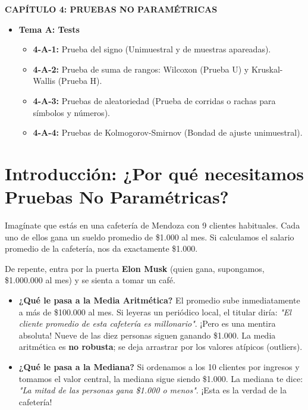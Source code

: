 \documentclass[11pt,a4paper]{article}
\begin{document}
\begin{tcolorbox}[colback=gray!5!white,colframe=gray!50!black,title=Unidad de Pruebas No Paramétricas]
    \textbf{CAPÍTULO 4: PRUEBAS NO PARAMÉTRICAS}
    \begin{itemize}
        \item \textbf{Tema A: Tests}
        \begin{itemize}
            \item \textbf{4-A-1:} Prueba del signo (Unimuestral y de muestras apareadas).
            \item \textbf{4-A-2:} Prueba de suma de rangos: Wilcoxon (Prueba U) y Kruskal-Wallis (Prueba H).
            \item \textbf{4-A-3:} Pruebas de aleatoriedad (Prueba de corridas o rachas para símbolos y números).
            \item \textbf{4-A-4:} Pruebas de Kolmogorov-Smirnov (Bondad de ajuste unimuestral).
        \end{itemize}
    \end{itemize}
\end{tcolorbox}

\newpage
\section{Introducción: ¿Por qué necesitamos Pruebas No Paramétricas?}
Imagínate que estás en una cafetería de Mendoza con 9 clientes habituales. Cada uno de ellos gana un sueldo promedio de \$1.000 al mes. Si calculamos el salario promedio de la cafetería, nos da exactamente \$1.000. 

De repente, entra por la puerta \textbf{Elon Musk} (quien gana, supongamos, \$1.000.000 al mes) y se sienta a tomar un café. 
\begin{itemize}
    \item \textbf{¿Qué le pasa a la Media Aritmética?} El promedio sube inmediatamente a más de \$100.000 al mes. Si leyeras un periódico local, el titular diría: \textit{"El cliente promedio de esta cafetería es millonario"}. ¡Pero es una mentira absoluta! Nueve de las diez personas siguen ganando \$1.000. La media aritmética es \textbf{no robusta}; se deja arrastrar por los valores atípicos (outliers).
    \item \textbf{¿Qué le pasa a la Mediana?} Si ordenamos a los 10 clientes por ingresos y tomamos el valor central, la mediana sigue siendo \$1.000. La mediana te dice: \textit{"La mitad de las personas gana \$1.000 o menos"}. ¡Esta es la verdad de la cafetería!
\end{itemize}
\end{document}
